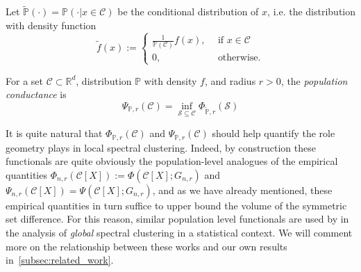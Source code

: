 \documentclass[11pt,twoside]{article}
\newcommand{\Reals}{\mathbb{R}}
\newcommand{\1}{\mathbf{1}}
\newcommand{\Rd}{\Reals^d}
\newcommand{\mc}[1]{\mathcal{#1}}
\newcommand{\Pbb}{\mathbb{P}}
\newcommand{\wt}[1]{\widetilde{#1}}
\begin{document}
Let $\wt{\mathbb{P}}(\cdot) = \mathbb{P}(\cdot|x \in \mc{C})$ be the conditional distribution of $x$, i.e. the distribution with density function
\begin{equation*}
\wt{f}(x) :=
\begin{cases*}
\frac{1}{\mathbb{P}(\mc{C})} f(x),~~ & \textrm{if $x \in \mc{C}$} \\
0,~~ & \textrm{otherwise.}
\end{cases*}
\end{equation*}

\begin{definition}
	For a set $\mc{C} \subset \Rd$, distribution $\Pbb$ with density $f$, and radius $r > 0$, the \emph{population conductance} is
	\begin{equation}
	\label{eqn:population_conductance}
	\Psi_{\mathbb{P},r}(\mc{C}) = \inf_{\mc{S} \subseteq \mc{C}} \Phi_{\wt{\Pbb},r}(\mc{S})
	\end{equation}
\end{definition}

It is quite natural that $\Phi_{\Pbb,r}(\mc{C})$ and $\Psi_{\Pbb,r}(\mc{C})$ should help quantify the role geometry plays in local spectral clustering. Indeed, by construction these functionals are quite obviously the population-level analogues of the empirical quantities $\Phi_{n,r}(\mc{C}[X]) := \Phi(\mc{C}[X];G_{n,r})$ and $\Psi_{n,r}(\mc{C}[X]) = \Psi(\mc{C}[X];G_{n,r})$, and as we have already mentioned, these empirical quantities in turn suffice to upper bound the volume of the symmetric set difference. For this reason, similar population level functionals are used by \citep{shi2009,schiebinger2015,garciatrillos19} in the analysis of \emph{global} spectral clustering in a statistical context. We will comment more on the relationship between these works and our own results in~\ref{subsec:related_work}.
\end{document}
